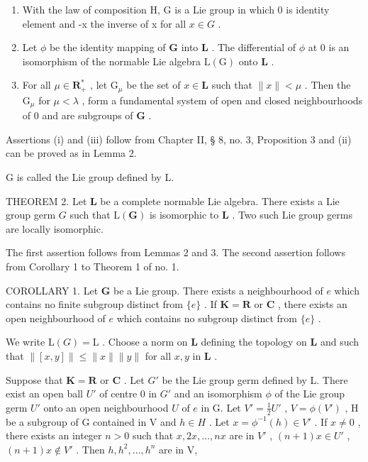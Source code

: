 \begin{enumerate}
\def\labelenumi{(\roman{enumi})}
\item
  With the law of composition H, G is a Lie group in which 0 is identity element and -x the inverse of x for all \(x \in G\) .
\item
  Let \(\phi\) be the identity mapping of \(\mathbf{G}\) into \(\mathbf{L}\) . The differential of \(\phi\) at 0 is an isomorphism of the normable Lie algebra \(\mathrm{L}(\mathrm{G})\) onto \(\mathbf{L}\) .
\item
  For all \(\mu \in \mathbf{R}_+^*\) , let \(\mathrm{G}_{\mu}\) be the set of \(x \in \mathbf{L}\) such that \(\| x \| < \mu\) . Then the \(\mathrm{G}_{\mu}\) for \(\mu < \lambda\) , form a fundamental system of open and closed neighbourhoods of 0 and are subgroups of \(\mathbf{G}\) .
\end{enumerate}

Assertions (i) and (iii) follow from Chapter II, § 8, no. 3, Proposition 3 and (ii) can be proved as in Lemma 2.

G is called the Lie group defined by L.

THEOREM 2. Let \(\mathbf{L}\) be a complete normable Lie algebra. There exists a Lie group germ \(G\) such that \(\mathrm{L}(\mathbf{G})\) is isomorphic to \(\mathbf{L}\) . Two such Lie group germs are locally isomorphic.

The first assertion follows from Lemmas 2 and 3. The second assertion follows from Corollary 1 to Theorem 1 of no. 1.

COROLLARY 1. Let \(\mathbf{G}\) be a Lie group. There exists a neighbourhood of \(e\) which contains no finite subgroup distinct from \(\{e\}\) . If \(\mathbf{K} = \mathbf{R}\) or \(\mathbf{C}\) , there exists an open neighbourhood of \(e\) which contains no subgroup distinct from \(\{e\}\) .

We write \(\mathrm{L}(G) = \mathrm{L}\) . Choose a norm on \(\mathbf{L}\) defining the topology on \(\mathbf{L}\) and such that \(\| [x,y]\| \leqslant \| x\| \| y\|\) for all \(x,y\) in \(\mathbf{L}\) .

Suppose that \(\mathbf{K} = \mathbf{R}\) or \(\mathbf{C}\) . Let \(G'\) be the Lie group germ defined by L. There exist an open ball \(U'\) of centre 0 in \(G'\) and an isomorphism \(\phi\) of the Lie group germ \(U'\) onto an open neighbourhood \(U\) of \(e\) in G. Let \(V' = \frac{1}{2} U'\) , \(V = \phi(V')\) , H be a subgroup of G contained in V and \(h \in H\) . Let \(x = \phi^{-1}(h) \in V'\) . If \(x \neq 0\) , there exists an integer \(n > 0\) such that \(x, 2x, \ldots, nx\) are in \(V'\) , \((n + 1)x \in U'\) , \((n + 1)x \notin V'\) . Then \(h, h^2, \ldots, h^n\) are in V,

